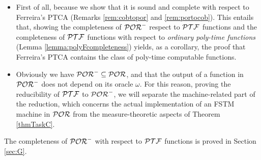 \begin{itemize}
  \item First of all, because we show that it is sound and complete
  with respect to Ferreira's PTCA \cite{Ferreira88}
  (Remarks \ref{rem:cobtopor} and \ref{rem:portocob}).
  This entails that, showing the completeness of $\mathcal{POR}^-$
  respect to $\mathcal{PTF}$ functions
  and the completeness of $\mathcal{PTF}$ functions with respect to
  \emph{ordinary poly-time functions} (Lemma \ref{lemma:polyFcompleteness})
  yields, as a corollary, the proof that
  Ferreira's PTCA contains the class of poly-time
  computable functions.
  \item Obviously we have $\mathcal{POR}^-\subseteq \mathcal{POR}$, and that
  the output of a function in $\mathcal{POR}^-$ does not depend on its oracle $\omega$.
  For this reason, proving the reducibility of $\mathcal{PTF}$ to $\mathcal{POR}^-$,
  we will separate
  the machine-related part of the reduction, which concerns the actual implementation
  of an FSTM machine in $\mathcal{POR}$ from the measure-theoretic aspects of Theorem
  \ref{thmTaskC}.
\end{itemize}

%
\noindent
The completeness of $\mathcal{POR}^-$ with
respect to $\mathcal{PTF}$ functions is proved in Section \ref{sec:G}.



